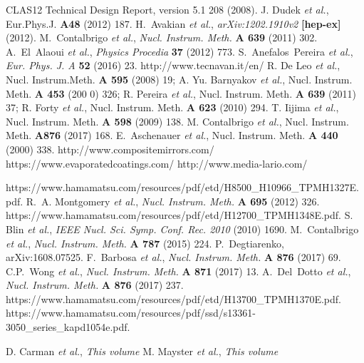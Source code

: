 \documentclass[final,5p,times,twocolumn]{elsarticle}
\def\etal{{\it et al.}}
\begin{document}
\begin{thebibliography}{00}

 CLAS12 Technical Design Report, version 5.1 208 (2008).
 J. Dudek {\it et al.}, Eur.Phys.J. {\bf A48} (2012) 187.
 H.~Avakian \etal, {\em arXiv:1202.1910v2} {\bf [hep-ex]} (2012).
 M.~Contalbrigo \etal, {\em Nucl. Instrum. Meth.} {\bf A 639} (2011) 302.
 A.~El~Alaoui \etal, {\em Physics Procedia} {\bf 37} (2012) 773.
 S.~Anefalos~Pereira \etal, {\em Eur. Phys. J. A} {\bf 52} (2016) 23.
 http://www.tecnavan.it/en/
 R. De Leo {\it et al.}, Nucl. Instrum.Meth. {\bf A 595} (2008) 19; A. Yu. Barnyakov {\it et al.}, Nucl. Instrum. Meth. {\bf A 453} (200
0) 326; R. Pereira {\it et al.}, Nucl. Instrum. Meth. {\bf A 639} (2011) 37; R. Forty {\it et al.}, Nucl. Instrum. Meth. {\bf A 623} (2010) 294.
 T. Iijima {\it et al.}, Nucl. Instrum. Meth. {\bf A 598} (2009) 138.
 M. Contalbrigo {\it et al.}, Nucl. Instrum. Meth. {\bf A876} (2017) 168.
 E.~Aschenauer  {\it et al.}, Nucl. Instrum. Meth. {\bf A 440} (2000) 338.
 http://www.compositemirrors.com/
 https://www.evaporatedcoatings.com/
 http://www.media-lario.com/

 https://www.hamamatsu.com/resources/pdf/etd/H8500\_H10966\_TPMH1327E.pdf.
 R.~A. Montgomery \etal, {\em Nucl. Instrum. Meth.} {\bf A 695} (2012) 326.
 https://www.hamamatsu.com/resources/pdf/etd/H12700\_TPMH1348E.pdf.
 S. Blin \etal, {\em IEEE Nucl. Sci. Symp. Conf. Rec. 2010} (2010) 1690.
 M.~Contalbrigo \etal, {\em Nucl. Instrum. Meth.} {\bf A 787} (2015) 224.
 P.~Degtiarenko, arXiv:1608.07525.
 F.~Barbosa \etal, {\em Nucl. Instrum. Meth.} {\bf A 876} (2017) 69. 
 C.P.~Wong \etal, {\em Nucl. Instrum. Meth.} {\bf A 871} (2017) 13. 
 A.~Del~Dotto \etal, {\em Nucl. Instrum. Meth.} {\bf A 876} (2017) 237.
 https://www.hamamatsu.com/resources/pdf/etd/H13700\_TPMH1370E.pdf.
 https://www.hamamatsu.com/resources/pdf/ssd/s13361-3050\_series\_kapd1054e.pdf.

 D. Carman \etal, {\em This volume}
 M. Mayster \etal, {\em This volume}


\end{thebibliography}
\end{document}
